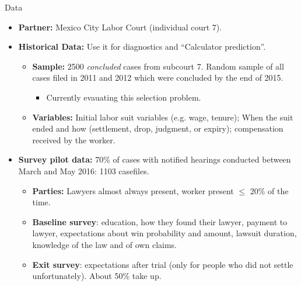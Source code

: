 \documentclass[9pt]{beamer}
\begin{document}
\begin{frame}{Data}{}
   \begin{itemize}
       \item \textbf{Partner:} Mexico City Labor Court (individual court 7).
       \vspace{0.1in}

        \item \textbf{Historical Data:} Use it for diagnostics and \alert{``Calculator prediction''}.
        \vspace{0.05in}
            \begin{itemize}
                \item \textbf{Sample:} 2500 \textit{concluded} cases from subcourt 7. Random sample of all cases filed in 2011 and 2012 which were concluded by the end of 2015.
                \vspace{0.05in}
                    \begin{itemize}
                        \item Currently evauating this selection problem.
                    \end{itemize}
                \item \textbf{Variables:} Initial labor suit variables (e.g. wage, tenure); When the suit ended and how (settlement, drop, judgment, or expiry); compensation received by the worker.
            \end{itemize}
            \vspace{0.1in}
        \item \textbf{Survey pilot data:} 70\% of cases with notified hearings conducted between March and May 2016: 1103 casefiles.
        \vspace{0.05in}
            \begin{itemize}
                \item \textbf{Parties:} Lawyers almost always present, worker present $\leq$ 20\% of the time. 
                \vspace{0.05in}
                \item \textbf{Baseline survey}: education, how they found their lawyer, payment to lawyer, expectations about win probability and amount, lawsuit duration, knowledge of the law and of own claims.
                \vspace{0.05in}
                \item \textbf{Exit survey}: expectations after trial (only for people who did not settle unfortunately). About 50\% take up.
            \end{itemize}
   \end{itemize}
\end{frame}
\end{document}
